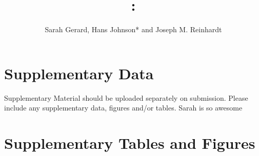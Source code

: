 \documentclass{frontiers_suppmat} %
\def\firstAuthorLast{Frontiers}
\def\Authors{Sarah Gerard, Hans Johnson* and Joseph M. Reinhardt}
\begin{document}
\onecolumn
{}

\title[Paper Starting for MICCAI]{{}:
\\ } %

\author[\firstAuthorLast ]{\Authors} %
\correspondance{} %

\extraAuth{}%

\maketitle


\section{Supplementary Data}

Supplementary Material should be uploaded separately on submission. Please include any supplementary data, figures and/or tables. 
Sarah is so awesome
\section{Supplementary Tables and Figures}
\end{document}

